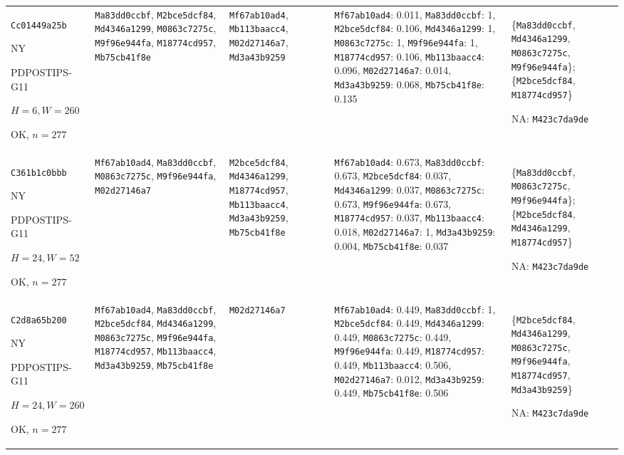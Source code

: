 \begin{longtable}{p{.15\linewidth}p{.17\linewidth}p{.17\linewidth}p{.25\linewidth}p{.14\linewidth}}
\texttt{Cc01449a25b}\par NY\par PDPOSTIPS-\allowbreak{}G11\par $H=6,W=260$\par OK, $n=277$ & \texttt{Ma83dd0ccbf}, \texttt{M2bce5dcf84}, \texttt{Md4346a1299}, \texttt{M0863c7275c}, \texttt{M9f96e944fa}, \texttt{M18774cd957}, \texttt{Mb75cb41f8e} & \texttt{Mf67ab10ad4}, \texttt{Mb113baacc4}, \texttt{M02d27146a7}, \texttt{Md3a43b9259} & \texttt{Mf67ab10ad4}: 0.011, \texttt{Ma83dd0ccbf}: 1, \texttt{M2bce5dcf84}: 0.106, \texttt{Md4346a1299}: 1, \texttt{M0863c7275c}: 1, \texttt{M9f96e944fa}: 1, \texttt{M18774cd957}: 0.106, \texttt{Mb113baacc4}: 0.096, \texttt{M02d27146a7}: 0.014, \texttt{Md3a43b9259}: 0.068, \texttt{Mb75cb41f8e}: 0.135 & \{\texttt{Ma83dd0ccbf}, \texttt{Md4346a1299}, \texttt{M0863c7275c}, \texttt{M9f96e944fa}\}; \{\texttt{M2bce5dcf84}, \texttt{M18774cd957}\}\par NA: \texttt{M423c7da9de} \\
\texttt{C361b1c0bbb}\par NY\par PDPOSTIPS-\allowbreak{}G11\par $H=24,W=52$\par OK, $n=277$ & \texttt{Mf67ab10ad4}, \texttt{Ma83dd0ccbf}, \texttt{M0863c7275c}, \texttt{M9f96e944fa}, \texttt{M02d27146a7} & \texttt{M2bce5dcf84}, \texttt{Md4346a1299}, \texttt{M18774cd957}, \texttt{Mb113baacc4}, \texttt{Md3a43b9259}, \texttt{Mb75cb41f8e} & \texttt{Mf67ab10ad4}: 0.673, \texttt{Ma83dd0ccbf}: 0.673, \texttt{M2bce5dcf84}: 0.037, \texttt{Md4346a1299}: 0.037, \texttt{M0863c7275c}: 0.673, \texttt{M9f96e944fa}: 0.673, \texttt{M18774cd957}: 0.037, \texttt{Mb113baacc4}: 0.018, \texttt{M02d27146a7}: 1, \texttt{Md3a43b9259}: 0.004, \texttt{Mb75cb41f8e}: 0.037 & \{\texttt{Ma83dd0ccbf}, \texttt{M0863c7275c}, \texttt{M9f96e944fa}\}; \{\texttt{M2bce5dcf84}, \texttt{Md4346a1299}, \texttt{M18774cd957}\}\par NA: \texttt{M423c7da9de} \\
\texttt{C2d8a65b200}\par NY\par PDPOSTIPS-\allowbreak{}G11\par $H=24,W=260$\par OK, $n=277$ & \texttt{Mf67ab10ad4}, \texttt{Ma83dd0ccbf}, \texttt{M2bce5dcf84}, \texttt{Md4346a1299}, \texttt{M0863c7275c}, \texttt{M9f96e944fa}, \texttt{M18774cd957}, \texttt{Mb113baacc4}, \texttt{Md3a43b9259}, \texttt{Mb75cb41f8e} & \texttt{M02d27146a7} & \texttt{Mf67ab10ad4}: 0.449, \texttt{Ma83dd0ccbf}: 1, \texttt{M2bce5dcf84}: 0.449, \texttt{Md4346a1299}: 0.449, \texttt{M0863c7275c}: 0.449, \texttt{M9f96e944fa}: 0.449, \texttt{M18774cd957}: 0.449, \texttt{Mb113baacc4}: 0.506, \texttt{M02d27146a7}: 0.012, \texttt{Md3a43b9259}: 0.449, \texttt{Mb75cb41f8e}: 0.506 & \{\texttt{M2bce5dcf84}, \texttt{Md4346a1299}, \texttt{M0863c7275c}, \texttt{M9f96e944fa}, \texttt{M18774cd957}, \texttt{Md3a43b9259}\}\par NA: \texttt{M423c7da9de} \\

\end{longtable}
